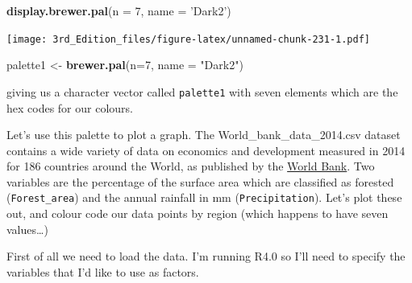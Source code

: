 \documentclass[
]{book}
\newenvironment{Shaded}{\begin{snugshade}}{\end{snugshade}}
\newcommand{\DataTypeTok}[1]{\textcolor[rgb]{0.13,0.29,0.53}{#1}}
\newcommand{\DecValTok}[1]{\textcolor[rgb]{0.00,0.00,0.81}{#1}}
\newcommand{\KeywordTok}[1]{\textcolor[rgb]{0.13,0.29,0.53}{\textbf{#1}}}
\newcommand{\NormalTok}[1]{#1}
\newcommand{\StringTok}[1]{\textcolor[rgb]{0.31,0.60,0.02}{#1}}
\begin{document}
\begin{Shaded}
\begin{Highlighting}[]
\KeywordTok{display.brewer.pal}\NormalTok{(}\DataTypeTok{n =} \DecValTok{7}\NormalTok{, }\DataTypeTok{name =} \StringTok{'Dark2'}\NormalTok{)}
\end{Highlighting}
\end{Shaded}

\texttt{[image: 3rd\_Edition\_files/figure-latex/unnamed-chunk-231-1.pdf]}

\begin{Shaded}
\begin{Highlighting}[]
\NormalTok{palette1 <-}\StringTok{ }\KeywordTok{brewer.pal}\NormalTok{(}\DataTypeTok{n=}\DecValTok{7}\NormalTok{, }\DataTypeTok{name =} \StringTok{"Dark2"}\NormalTok{)}
\end{Highlighting}
\end{Shaded}

giving us a character vector called \texttt{palette1} with seven elements which are the hex codes for our colours.

\begin{Shaded}
\end{Shaded}

Let's use this palette to plot a graph. The World\_bank\_data\_2014.csv dataset contains a wide variety of data on economics and development measured in 2014 for 186 countries around the World, as published by the \href{https://data.worldbank.org/}{World Bank}. Two variables are the percentage of the surface area which are classified as forested (\texttt{Forest\_area}) and the annual rainfall in mm (\texttt{Precipitation}). Let's plot these out, and colour code our data points by region (which happens to have seven values\ldots)

First of all we need to load the data. I'm running R4.0 so I'll need to specify the variables that I'd like to use as factors.
\end{document}

